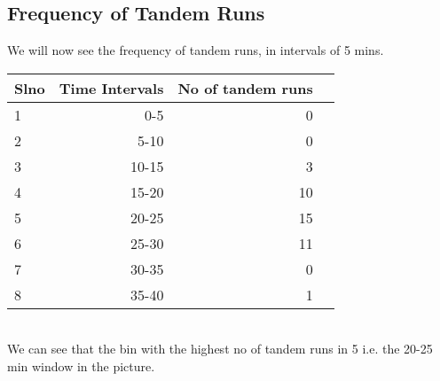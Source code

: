 \documentclass{scrartcl}
\begin{document}
\subsection{Frequency of Tandem Runs}
We will now see the frequency of tandem runs, in intervals of 5 mins. 
\begin{table}[H]\centering
\scriptsize
\begin{tabular}{lrrr}\toprule
    Slno&Time Intervals &No of tandem runs \\\midrule
1&0-5 &0 \\
2&5-10 &0 \\
3&10-15 &3 \\
4&15-20 &10 \\
5&20-25 &15 \\
6&25-30 &11 \\
7&30-35 &0 \\
8&35-40 &1 \\
\bottomrule
\end{tabular}
\end{table}
\\
    We can see that the bin with the highest no of tandem runs in 5 i.e. the 20-25 min window in the 
picture.
\end{document}
